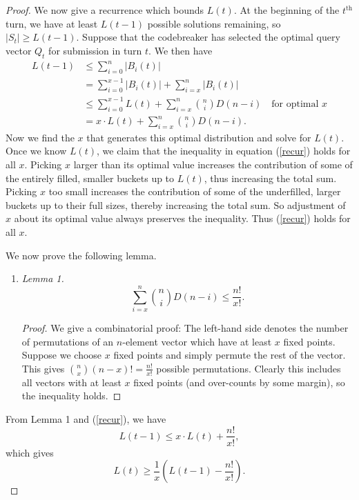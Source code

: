 \documentclass[12pt, a4paper]{article}
\begin{document}
\begin{proof}
		 We now give a recurrence which bounds $L(t)$. At the beginning of the $t^\text{th}$ turn, we have at least $L(t-1)$ possible solutions remaining, so $|S_t|\ge L(t-1)$. Suppose that the codebreaker has selected the optimal query vector $Q_t$ for submission in turn $t$. We then have 
		\begin{align}\label{recur}
			L(t-1)
			& \le \sum_{i = 0}^{n}|B_i(t)|\nonumber\\
			& = \sum_{i=0}^{x-1}|B_i(t)| + \sum_{i=x}^{n}|B_i(t)|\nonumber\\
			& \le \sum_{i = 0}^{x-1}L(t) + \sum_{i=x}^{n}\binom{n}{i}D(n-i)\quad
			\text{for optimal $x$}\nonumber\\
			& = x\cdot L(t) + \sum_{i = x}^{n}\binom{n}{i}D(n-i).
		\end{align}
		Now we find the $x$ that generates this optimal distribution and solve for $L(t)$. Once we know $L(t)$, we claim that the inequality in equation (\ref{recur}) holds for all $x$. Picking $x$ larger than its optimal value increases the contribution of some of the entirely filled, smaller buckets up to $L(t)$, thus increasing the total sum. Picking $x$ too small increases the contribution of some of the underfilled, larger buckets up to their full sizes, thereby increasing the total sum. So adjustment of $x$ about its optimal value always preserves the inequality. Thus (\ref{recur}) holds for all $x$.
		
		
		We now prove the following lemma.
		\begin{enumerate}[label=]
			\item\textit{Lemma 1.}
			\begin{equation*}
				\sum_{i=x}^n\binom{n}{i}D(n-i) \le \frac{n!}{x!}.
			\end{equation*}
			\begin{proof}
				We give a combinatorial proof: The left-hand side denotes the number of permutations of an $n$-element vector which have at least $x$ fixed points. Suppose we choose $x$ fixed points and simply permute the rest of the vector. This gives $\binom{n}{x}(n-x)!=\frac{n!}{x!}$ possible permutations. Clearly this includes all vectors with at least $x$ fixed points (and over-counts by some margin), so the inequality holds.
			\end{proof}
		\end{enumerate}
		
		From Lemma 1 and (\ref{recur}), we have
		\begin{equation*}
			L(t-1) \le x\cdot L(t) + \frac{n!}{x!},
		\end{equation*}
		which gives
		\begin{equation*}
			L(t)\ge \frac{1}{x}\left(L(t-1)-\frac{n!}{x!}\right).
		\end{equation*}
		

\end{proof}
\end{document}
